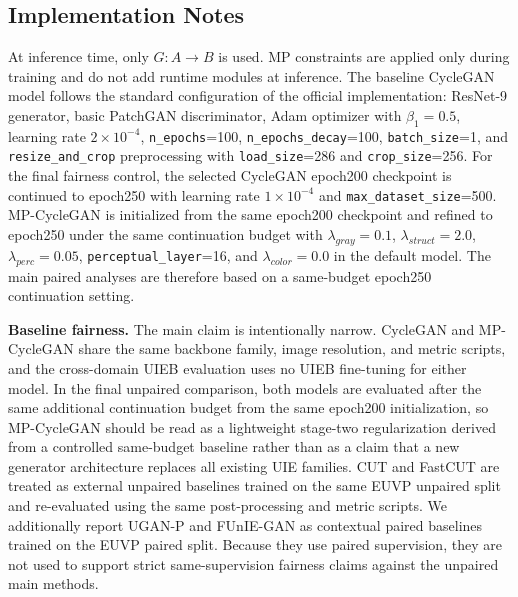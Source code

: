 \documentclass[final,1p,times]{elsarticle}
\begin{document}
\subsection{Implementation Notes}
At inference time, only $G: A\rightarrow B$ is used. MP constraints are applied only during training and do not add runtime modules at inference. The baseline CycleGAN model follows the standard configuration of the official implementation: ResNet-9 generator, basic PatchGAN discriminator, Adam optimizer with $\beta_1=0.5$, learning rate $2\times10^{-4}$, \texttt{n\_epochs}=100, \texttt{n\_epochs\_decay}=100, \texttt{batch\_size}=1, and \texttt{resize\_and\_crop} preprocessing with \texttt{load\_size}=286 and \texttt{crop\_size}=256. For the final fairness control, the selected CycleGAN epoch200 checkpoint is continued to epoch250 with learning rate $1\times10^{-4}$ and \texttt{max\_dataset\_size}=500. MP-CycleGAN is initialized from the same epoch200 checkpoint and refined to epoch250 under the same continuation budget with $\lambda_{gray}=0.1$, $\lambda_{struct}=2.0$, $\lambda_{perc}=0.05$, \texttt{perceptual\_layer}=16, and $\lambda_{color}=0.0$ in the default model. The main paired analyses are therefore based on a same-budget epoch250 continuation setting.

\textbf{Baseline fairness.} The main claim is intentionally narrow. CycleGAN and MP-CycleGAN share the same backbone family, image resolution, and metric scripts, and the cross-domain UIEB evaluation uses no UIEB fine-tuning for either model. In the final unpaired comparison, both models are evaluated after the same additional continuation budget from the same epoch200 initialization, so MP-CycleGAN should be read as a lightweight stage-two regularization derived from a controlled same-budget baseline rather than as a claim that a new generator architecture replaces all existing UIE families. CUT and FastCUT are treated as external unpaired baselines trained on the same EUVP unpaired split and re-evaluated using the same post-processing and metric scripts. We additionally report UGAN-P and FUnIE-GAN as contextual paired baselines trained on the EUVP paired split. Because they use paired supervision, they are not used to support strict same-supervision fairness claims against the unpaired main methods.
\end{document}

